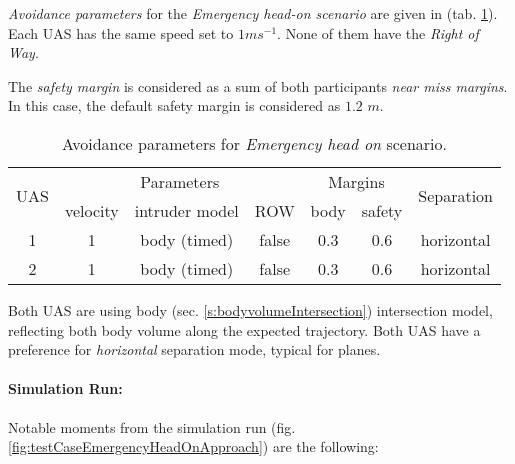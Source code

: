 \noindent \emph{Avoidance parameters} for the \emph{Emergency head-on scenario} are given in (tab. \ref{tab:aboidanceParametersForEmergencyHeadOnScenario}). Each UAS has the same speed set to $1 m s^{-1}$. None of them have the \emph{Right of Way}. 

The \emph{safety margin} is considered as a sum of both participants \emph{near miss margins}. In this case, the default safety margin is considered as $1.2$ $m$.

\begin{table}[H]
    \centering
    \begin{tabular}{c||c|c|c||c|c||c}
        \multirow{2}{*}{UAS} & \multicolumn{3}{c||}{Parameters} & \multicolumn{2}{c||}{Margins} & \multirow{2}{*}{Separation}                                            \\\cline{2-6}
                             & velocity & intruder model & ROW        & body & safety \\\hline\hline
        1                    & 1        & body (timed)  & false            & 0.3         & 0.6           & horizontal\\\hline
        2                    & 1        & body (timed)  & false             & 0.3         & 0.6  & horizontal          \\
    \end{tabular}
    \caption{Avoidance parameters for  \emph{Emergency head on} scenario.}
    \label{tab:aboidanceParametersForEmergencyHeadOnScenario}
\end{table}


\begin{note}
Both UAS are using  body (sec. \ref{s:bodyvolumeIntersection}) intersection model, reflecting both body volume along the expected  trajectory. Both UAS have a preference for \emph{horizontal} separation mode, typical for planes.
\end{note}

\paragraph{Simulation Run:} Notable moments from the simulation run (fig. \ref{fig:testCaseEmergencyHeadOnApproach}) are the following:

